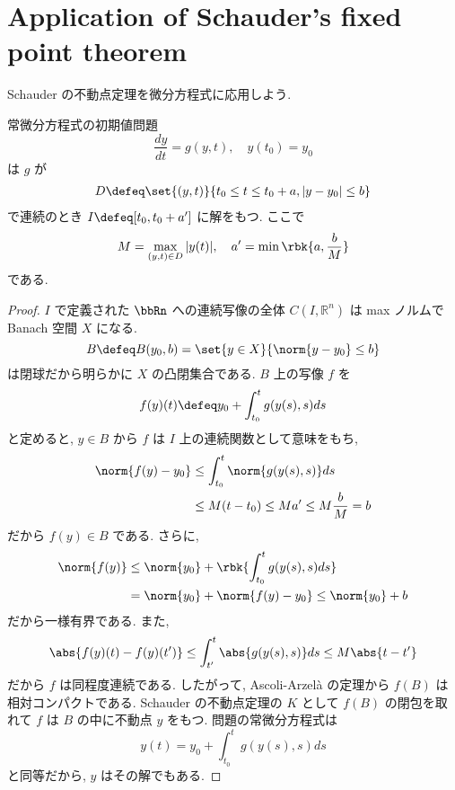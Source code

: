 \documentclass[openany, a4paper, oneside]{jsbook}
\begin{document}
\section{Application of Schauder's fixed point theorem}

Schauder の不動点定理を微分方程式に応用しよう.
\begin{thm}
常微分方程式の初期値問題
\begin{equation}
 \frac{dy}{dt}
 =
 g (y, t), \quad y(t_0) =y_0
\end{equation}
は $g$ が
\begin{align}
 D
 \defeq
 \set{(y, t)}{t_0 \le t \le t_0 + a, |y - y_0| \le b}
\end{align}
で連続のとき $I \defeq [t_0, t_0 + a']$ に解をもつ.
ここで
\begin{equation}
 M = \max_{(y, t) \in D} |y (t)|, \quad a' = \min \rbk{a, \frac{b}{M}}
\end{equation}
である.
\end{thm}
\begin{proof}
$I$ で定義された $\bbRn$ への連続写像の全体 $C (I, \mathbb{R}^n)$ は max ノルムで Banach 空間 $X$ になる.
\begin{equation}
 B
 \defeq
 B (y_0, b)
 =
 \set{y \in X}{\norm{y - y_0} \le b }
\end{equation}
は閉球だから明らかに $X$ の凸閉集合である.
$B$ 上の写像 $f$ を
\begin{equation}
 f(y) (t)
 \defeq
 y_0 + \int_{t_0}^t g (y (s), s) ds
\end{equation}
と定めると, $y \in B$ から $f$ は $I$ 上の連続関数として意味をもち,
\begin{align}
 \norm{f (y) - y_0}
 &\le
 \int_{t_0}^t \norm{g (y (s), s)} ds \\
 &\le
 M (t - t_0)
 \le
 Ma'
 \le
 M\frac{b}{M}
 =
 b
\end{align}
だから $f (y) \in B$ である.
さらに,
\begin{align}
 \norm{f (y)}
 &\le
 \norm{y_0} + \rbk{\int_{t_0}^t g (y (s),s) ds} \\
 &=
 \norm{y_0} + \norm{f (y) - y_0}
 \le
 \norm{y_0} + b
\end{align}
だから一様有界である.
また,
\begin{equation}
 \abs{f (y) (t) - f (y) (t')}
 \le
 \int_{t'}^t \abs{g (y (s), s)} ds
 \le
 M \abs{t - t'}
\end{equation}
だから $f$ は同程度連続である.
したがって, Ascoli-Arzel\`a の定理から $f (B)$ は相対コンパクトである.
Schauder の不動点定理の $K$ として $f (B)$ の閉包を取れて $f$ は $B$ の中に不動点 $y$ をもつ.
問題の常微分方程式は
\begin{equation}
 y (t)
 =
 y_0 + \int_{t_0}^t g (y (s), s) ds
\end{equation}
と同等だから, $y$ はその解でもある.
\end{proof}
\end{document}

